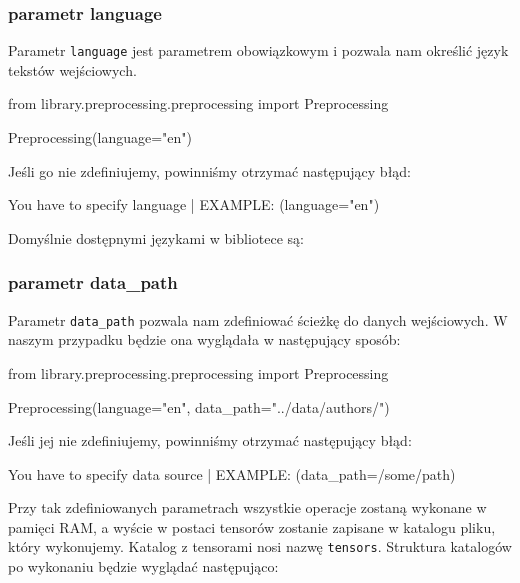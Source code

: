 \subsubsection{parametr language}
Parametr \texttt{language} jest parametrem obowiązkowym i pozwala nam określić język tekstów wejściowych.
\begin{python}
from library.preprocessing.preprocessing import Preprocessing

Preprocessing(language="en")

\end{python}

Jeśli go nie zdefiniujemy, powinniśmy otrzymać następujący błąd:

\begin{consolerror}
You have to specify language | EXAMPLE: (language="en")
\end{consolerror}

Domyślnie dostępnymi językami w bibliotece są:

\languages 

\subsubsection{parametr data\_path}
Parametr \texttt{data\_path} pozwala nam zdefiniować ścieżkę do danych wejściowych. W naszym przypadku
będzie ona wyglądała w następujący sposób:
\begin{python}
from library.preprocessing.preprocessing import Preprocessing

Preprocessing(language="en",
              data_path="../data/authors/")
                   
\end{python}

Jeśli jej nie zdefiniujemy, powinniśmy otrzymać następujący błąd:

\begin{consolerror}
You have to specify data source | EXAMPLE: (data_path=/some/path)
\end{consolerror}

Przy tak zdefiniowanych parametrach wszystkie operacje zostaną wykonane w pamięci RAM, a wyście w postaci
tensorów zostanie zapisane w katalogu pliku, który wykonujemy. Katalog z tensorami nosi nazwę \texttt{tensors}.
Struktura katalogów po wykonaniu będzie wyglądać następująco:

\myspace
{}
\myspace

